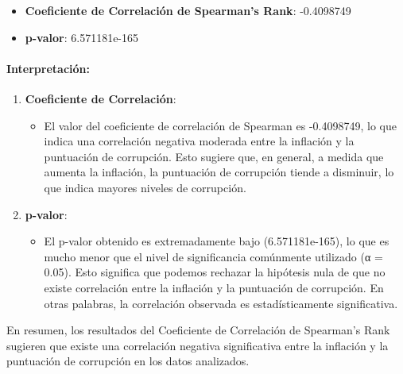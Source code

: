 \documentclass[
]{article}
\providecommand{\tightlist}{%
  \setlength{\itemsep}{0pt}\setlength{\parskip}{0pt}}
\begin{document}
\begin{itemize}
\tightlist
\item
  \textbf{Coeficiente de Correlación de Spearman's Rank}: -0.4098749
\item
  \textbf{p-valor}: 6.571181e-165
\end{itemize}

\paragraph{Interpretación:}\label{interpretaciuxf3n}

\begin{enumerate}
\def\labelenumi{\arabic{enumi}.}
\tightlist
\item
  \textbf{Coeficiente de Correlación}:

  \begin{itemize}
  \tightlist
  \item
    El valor del coeficiente de correlación de Spearman es -0.4098749,
    lo que indica una correlación negativa moderada entre la inflación y
    la puntuación de corrupción. Esto sugiere que, en general, a medida
    que aumenta la inflación, la puntuación de corrupción tiende a
    disminuir, lo que indica mayores niveles de corrupción.
  \end{itemize}
\item
  \textbf{p-valor}:

  \begin{itemize}
  \tightlist
  \item
    El p-valor obtenido es extremadamente bajo (6.571181e-165), lo que
    es mucho menor que el nivel de significancia comúnmente utilizado (α
    = 0.05). Esto significa que podemos rechazar la hipótesis nula de
    que no existe correlación entre la inflación y la puntuación de
    corrupción. En otras palabras, la correlación observada es
    estadísticamente significativa.
  \end{itemize}
\end{enumerate}

En resumen, los resultados del Coeficiente de Correlación de Spearman's
Rank sugieren que existe una correlación negativa significativa entre la
inflación y la puntuación de corrupción en los datos analizados.
\end{document}
